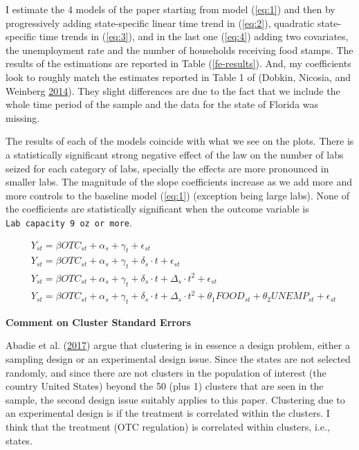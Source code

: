 \documentclass[
  11pt,
]{article}
\begin{document}
I estimate the 4 models of the paper starting from model (\ref{eq:1})
and then by progressively adding state-specific linear time trend in
(\ref{eq:2}), quadratic state-specific time trends in (\ref{eq:3}), and
in the last one (\ref{eq:4}) adding two covariates, the unemployment
rate and the number of households receiving food stamps. The results of
the estimations are reported in Table (\ref{fe-results}). And, my
coefficients look to roughly match the estimates reported in Table 1 of
(Dobkin, Nicosia, and Weinberg
\protect\hyperlink{ref-DOBKIN201448}{2014}). They slight differences are
due to the fact that we include the whole time period of the sample and
the data for the state of Florida was missing.

The results of each of the models coincide with what we see on the
plots. There is a statistically significant strong negative effect of
the law on the number of labs seized for each category of labs,
specially the effects are more pronounced in smaller labs. The magnitude
of the slope coefficients increase as we add more and more controls to
the baseline model (\ref{eq:1}) (exception being large labs). None of
the coefficients are statistically significant when the outcome variable
is \texttt{Lab\ capacity\ 9\ oz\ or\ more}.

\begin{align}
& Y_{s t}=\beta O T C_{s t} + \alpha_{s} + \gamma_{t} + \epsilon_{s t}
\label{eq:1}\\
& Y_{s t}=\beta O T C_{s t} + \alpha_{s} + \gamma_{t} + \delta_{s} \cdot t + \epsilon_{s t}\label{eq:2} \\
& Y_{s t}=\beta O T C_{s t} + \alpha_{s} + \gamma_{t} + \delta_{s} \cdot t + \Delta_{s} \cdot t^2 + \epsilon_{s t}\label{eq:3} \\
& Y_{s t}=\beta O T C_{s t} + \alpha_{s} + \gamma_{t} + \delta_{s} \cdot t + \Delta_{s} \cdot t^2 + \theta_1FOOD_{st} + \theta_{2} UNEMP_{st} + \epsilon_{s t} \label{eq:4}
\end{align}

\textbf{\large Comment on Cluster Standard Errors}

Abadie et al. (\protect\hyperlink{ref-Abadie2017}{2017}) argue that
clustering is in essence a design problem, either a sampling design or
an experimental design issue. Since the states are not selected
randomly, and since there are not clusters in the population of interest
(the country United States) beyond the 50 (plus 1) clusters that are
seen in the sample, the second design issue suitably applies to this
paper. Clustering due to an experimental design is if the treatment is
correlated within the clusters. I think that the treatment (OTC
regulation) is correlated within clusters, i.e., states.
\end{document}
